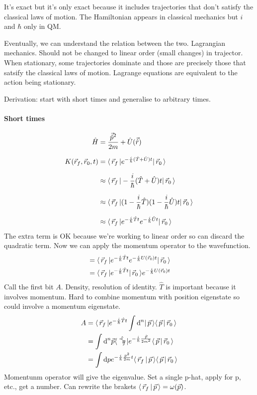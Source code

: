 \documentclass[a4paper]{extarticle}
\newcommand{\ihbar}{\frac{i}{\hbar}}
\newcommand{\propagator}{K(\vec{r}_f, \vec{r}_0, t)}
\begin{document}
It's exact but it's only exact because it includes trajectories that don't satisfy
the classical laws of motion.
The Hamiltonian appears in classical mechanics but $i$ and $\hbar$ only in QM.

Eventually, we can understand the relation between the two.
Lagrangian mechanics.
Should not be changed to linear order (small changes) in trajector.
When stationary, some trajectories dominate and those are precisely those that
satsify the classical laws of motion.
Lagrange equations are equivalent to the action being stationary.

Derivation: start with short times and generalise to arbitrary times.

\paragraph{Short times}

\begin{align}
  \hat{H}
   & = \frac{\vec{\hat{p}}^2}{2m} + \hat{U}(\vec{\hat{r}})                            \\[1.5ex]
  \propagator
   & = \bra{\vec{r}_f} e^{-\ihbar (\hat{T} + \hat{U}) t} \ket{\vec{r}_0}              \\[1.5ex]
   & \approx \bra{\vec{r}_f} -\ihbar (\hat{T} + \hat{U}) t \ket{\vec{r}_0}            \\[1.5ex]
   & \approx \bra{\vec{r}_f} (1 - \ihbar\hat{T})(1 - \ihbar\hat{U}) t \ket{\vec{r}_0} \\[1.5ex]
   & \approx \bra{\vec{r}_f} e^{-\ihbar\hat{T}t} e^{-\ihbar\hat{U}t} \ket{\vec{r}_0}
\end{align}
The extra term is OK because we're working to linear order so can discard the
quadratic term.
Now we can apply the momentum operator to the wavefunction.
\begin{align}
   & = \bra{\vec{r}_f} e^{-\ihbar\hat{T}t} e^{-\ihbar U(\vec{r}_0) t} \ket{\vec{r}_0} \\
   & = \bra{\vec{r}_f} e^{-\ihbar\hat{T}t} \ket{\vec{r}_0} e^{-\ihbar U(\vec{r}_0) t}
\end{align}
Call the first bit $A$.
Density, resolution of identity.
$\hat{T}$ is important because it involves momentum.
Hard to combine momentum with position eigenstate so could involve a momentum eigenstate.
\begin{align}
  A
   & = \bra{\vec{r}_f} e^{-\ihbar\hat{T}t} \int \text{d}^n \ket{\vec{p}} \braket{\vec{p}}{\vec{r}_0}                  \\
   & = \int \text{d}^n\vec{p} \bra{\hat{\vec{r}_f}} e^{-\ihbar\frac{\hat{\vec{p}}}{2m^2}} \braket{\vec{p}}{\vec{r}_0} \\
   & = \int \text{d}p e^{-\ihbar\frac{p^2}{2m}t} \braket{\vec{r}_f}{\vec{p}} \braket{\vec{p}}{\vec{r}_0}
\end{align}
Momentunm operator will give the eigenvalue.
Set a single p-hat, apply for p, etc., get a number.
Can rewrite the brakets $\langle\,\vec{r}_f\,\vert\,\vec{p}\,\rangle = \omega(\vec{p})$.
\end{document}
